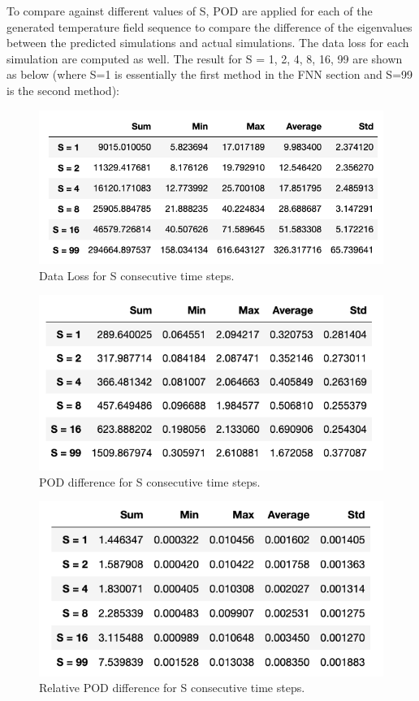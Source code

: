 To compare against different values of S, POD are applied for each of the generated temperature field sequence to compare the difference of the eigenvalues between the predicted simulations and actual simulations. The data loss for each simulation are computed as well. The result for S = 1, 2, 4, 8, 16, 99 are shown as below (where S=1 is essentially the first method in the FNN section and S=99 is the second method):

\begin{figure}[H]
    \caption{Data Loss for S consecutive time steps.}
    \includegraphics[scale=0.7]{figures/mantle_convection_images/further_testings/Data_Loss_table.png}
\end{figure}

\begin{figure}[H]
    \caption{POD difference for S consecutive time steps.}
    \includegraphics[scale=0.7]{figures/mantle_convection_images/further_testings/POD_table.png}
\end{figure}

\begin{figure}[H]
    \caption{Relative POD difference for S consecutive time steps.}
    \includegraphics[scale=0.7]{figures/mantle_convection_images/further_testings/Relative_POD_table.png}
\end{figure}

